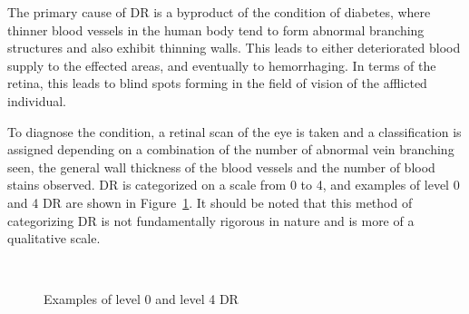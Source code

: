 \documentclass[letterpaper,12pt]{article}
\newcommand{\figref}[1]{Figure~\ref{#1}}
\begin{document}
The primary cause of DR is a byproduct of the condition of diabetes, where thinner blood vessels in the human body tend to form abnormal branching structures and also exhibit thinning walls. This leads to either deteriorated blood supply to the effected areas, and eventually to hemorrhaging. In terms of the retina, this leads to blind spots forming in the field of vision of the afflicted individual. 

To diagnose the condition, a retinal scan of the eye is taken and a classification is assigned depending on a combination of the number of abnormal vein branching seen, the general wall thickness of the blood vessels and the number of blood stains observed. DR is categorized on a scale from 0 to 4, and examples of level 0 and 4 DR are shown in \figref{marking_image}. It should be noted that this method of categorizing DR is not fundamentally rigorous in nature and is more of a qualitative scale. 

\begin{figure}[htbp]
\begin{center}
  \ \ \ \ 
\caption{Examples of level 0 and level 4 DR}
\label{marking_image}
\end{center}
\end{figure}
\end{document}
